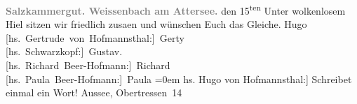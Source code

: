 \begin{ledgroupsized}[t]{13cm}
           \noindent{}\centering{}\textcolor{gray}{\textbf{{\pb}Salzkammergut. Weissenbach am Attersee.}}\pend
           \pstart
           \raggedleft{}{\pb}den 15\textsuperscript{ten}\pend
           \pstart
           Unter wolkenlosem Hi{\geminationm}el sitzen wir friedlich zusa{\geminationm}en und wünschen Euch das Gleiche.\pend
           \pstart
           \spacefill\mbox{Hugo}{\\[\baselineskip]}\spacefill\mbox{{[}hs. Gertrude von Hofmannsthal:{]} Gerty}{\\[\baselineskip]}\spacefill\mbox{{[}hs. Schwarzkopf:{]} Gustav.}{\\[\baselineskip]}\spacefill\mbox{{[}hs. Richard Beer-Hofmann:{]} Richard}{\\[\baselineskip]}\spacefill\mbox{{[}hs. Paula Beer-Hofmann:{]} Paula}\pend
           \leftskip=0em{}\pstart
           \noindent{}{[}hs. Hugo von Hofmannsthal:{]} Schreibet einmal ein Wort!\pend
           \pstart
           Aussee, Obertressen 14\pend
           
         
         \endnumbering{}\end{ledgroupsized}  \newcommand{\dateiname}{L02187}\newcommand{\titel}{Hugo von Hofmannsthal u.a. an Arthur Schnitzler, 15. [7. 1914]}\newcommand{\editorInnen}{Martin Anton Müller und Gerd-Hermann Susen}
      